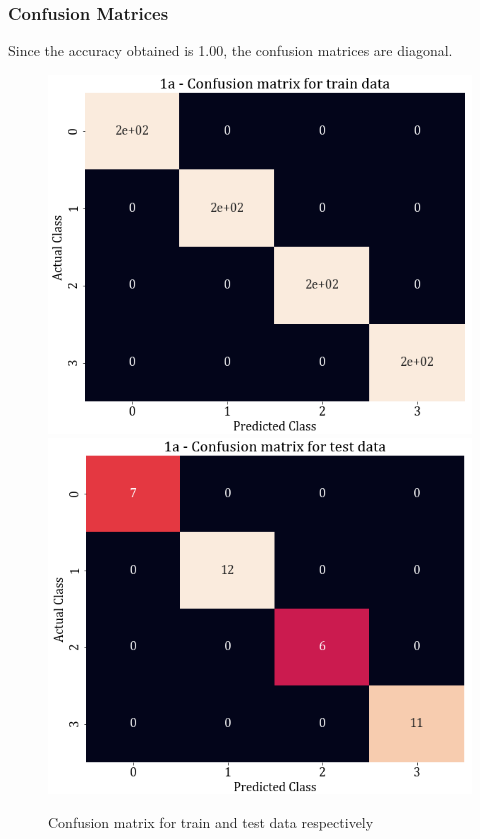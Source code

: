 \documentclass[11pt,a4paper]{article}
\begin{document}
\subsubsection{Confusion Matrices}
Since the accuracy obtained is 1.00, the confusion matrices are diagonal. 
\begin{figure}[H]
\centering
    \includegraphics[scale=0.4]{images/1A_confmatrix_train.png}
    \includegraphics[scale=0.4]{images/1A_confmatrix_test.png}
    \caption{Confusion matrix for train and test data respectively}
\end{figure}
\end{document}
